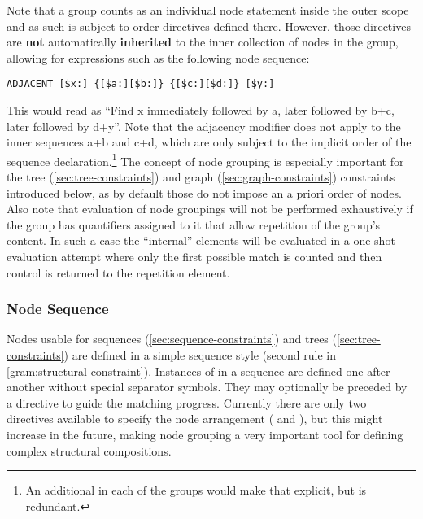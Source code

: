\documentclass[11pt,a4paper]{report}
\begin{document}
Note that a group counts as an individual node statement inside the outer scope and as such is subject to order directives defined there.
However, those directives are \textbf{not} automatically \textbf{inherited} to the inner collection of nodes in the group, allowing for expressions such as the following node sequence:
\begin{Verbatim}[samepage=true]
ADJACENT [$x:] {[$a:][$b:]} {[$c:][$d:]} [$y:]
\end{Verbatim}
\noindent This would read as ``Find x immediately followed by a, later followed by b+c, later followed by d+y''.
Note that the adjacency modifier does not apply to the inner sequences a+b and c+d, which are only subject to the implicit order of the sequence declaration.\footnote{An additional  in each of the groups would make that explicit, but is redundant.}
The concept of node grouping is especially important for the tree (\ref{sec:tree-constraints}) and graph (\ref{sec:graph-constraints}) constraints introduced below, as by default those do not impose an a priori order of nodes.
Also note that evaluation of node groupings will not be performed exhaustively if the group has quantifiers assigned to it that allow repetition of the group's content.
In such a case the ``internal'' elements will be evaluated in a one-shot evaluation attempt where only the first possible match is counted and then control is returned to the repetition element.

\subsubsection{Node Sequence}
\label{sec:node-sequences}
\noindent Nodes usable for sequences (\ref{sec:sequence-constraints}) and trees (\ref{sec:tree-constraints}) are defined in a simple sequence style (second  rule in \cref{gram:structural-constraint}).
Instances of  in a sequence are defined one after another without special separator symbols.
They may optionally be preceded by a  directive to guide the matching progress.
Currently there are only two directives available to specify the node arrangement ( and ), but this might increase in the future, making node grouping a very important tool for defining complex structural compositions.
\end{document}
